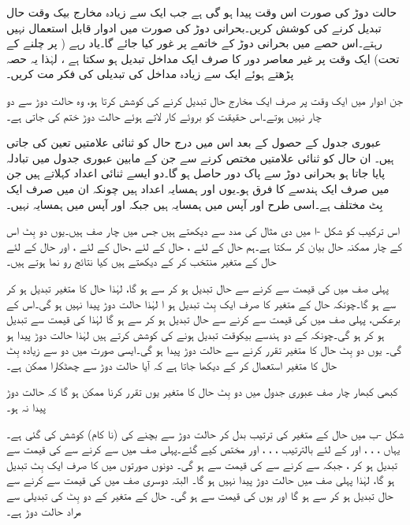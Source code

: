 حالت دوڑ کی صورت اس وقت پیدا ہو گی ہے جب ایک سے زیادہ مخارج بیک وقت حال تبدیل کرنے کی کوشش کریں۔بحرانی دوڑ کی صورت میں ادوار قابل استعمال نہیں رہتے۔اس حصے میں بحرانی دوڑ کے خاتمے پر غور کیا جائے گا۔یاد رہے ( پر چلنے کے تحت) ایک وقت پر غیر معاصر دور کا صرف ایک مداخل تبدیل ہو سکتا ہے ، لہٰذا یہ حصہ پڑھتے ہوئے ایک سے زیادہ مداخل کی تبدیلی کی فکر مت کریں۔

جن ادوار میں ایک وقت پر صرف ایک مخارج حال تبدیل کرنے کی کوشش کرتا ہو، وہ حالت دوڑ سے دو چار نہیں ہوتے۔اس حقیقت کو بروئے کار لاتے ہوئے حالت دوڑ ختم کی جاتی ہے۔

عبوری جدول کے حصول کے بعد اس میں درج حال کو ثنائی علامتیں تعین کی جاتی ہیں۔ ان حال کو  ثنائی علامتیں مختص کرنے سے جن کے مابین عبوری جدول میں تبادلہ پایا جاتا ہو بحرانی دوڑ سے پاک دور حاصل ہو گا۔دو ایسے ثنائی اعداد  کہلاتے ہیں جن میں صرف ایک ہندسے کا فرق ہو۔یوں  اور  ہمسایہ اعداد ہیں چونکہ ان میں صرف ایک بِٹ مختلف ہے۔اسی طرح  اور  آپس میں ہمسایہ ہیں جبکہ  اور  آپس میں ہمسایہ نہیں۔

اس ترکیب کو شکل -ا میں دی مثال کی مدد سے دیکھتے ہیں جس میں چار صف ہیں۔یوں دو بِٹ  اس کے چار ممکنہ حال بیان کر سکتا ہے۔ہم حال  کے لئے ، حال  کے لئے ،حال  کے لئے ، اور حال  کے لئے  حال کے متغیر منتخب کر کے دیکھتے ہیں کیا نتائج رو نما ہوتے ہیں۔

 پہلی صف میں  کی قیمت  سے  کرنے سے حال تبدیل ہو کر سے  ہو گا، لہٰذا حال کا متغیر  تبدیل ہو کر  سے  ہو گا۔چونکہ حال کے متغیر کا صرف ایک بِٹ تبدیل ہو ا لہٰذا حالت دوڑ پیدا نہیں ہو گی۔اس کے برعکس، پہلی صف میں  کی قیمت  سے  کرنے سے حال تبدیل ہو کر  سے  ہو گا لہٰذا  کی قیمت  سے تبدیل ہو کر  ہو گی۔چونکہ  کے دو ہندسے بیکوقت تبدیل ہونے کی کوشش کرتے ہیں لہٰذا حالت دوڑ پیدا ہو گی۔ یوں دو بِٹ حال کا متغیر تقرر کرنے سے حالت دوڑ پیدا ہو گی۔ایسی صورت میں دو سے زیادہ بِٹ حال کا متغیر استعمال کر کے دیکھا جاتا ہے کہ آیا حالت دوڑ سے چھٹکارا ممکن ہے۔

کبھی کبھار چار صف عبوری جدول میں دو بِٹ حال کا متغیر یوں تقرر کرنا ممکن ہو گا کہ حالت دوڑ پیدا نہ ہو۔

شکل  -ب میں حال کے متغیر کی ترتیب بدل کر حالت دوڑ سے بچنے کی (نا کام) کوشش کی گئی ہے۔ یہاں ، ، ، اور  کے لئے بالترتیب ، ، ، اور  مختص کیے گئے۔پہلی صف میں سے  کرنے سے  کی قیمت  سے تبدیل ہو کر  ، جبکہ  سے  کرنے سے  کی قیمت  سے  ہو گی۔ دونوں صورتوں میں  کا صرف ایک بِٹ تبدیل ہو گا، لہٰذا پہلی صف میں حالت دوڑ پیدا نہیں ہو گا۔ البتہ دوسری صف میں  کی قیمت  سے  کرنے سے حال تبدیل ہو کر  سے  ہو گا اور یوں  کی قیمت  سے  ہو گی۔ حال کے متغیر کے دو بِٹ کی تبدیلی سے مراد حالت دوڑ ہے۔

